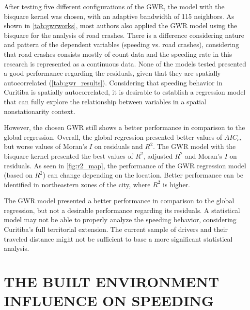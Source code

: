 

After testing five different configurations of the GWR, the model with the bisquare kernel was chosen, with an adaptive bandwidth of 115 neighbors. As shown in \autoref{tab:gwrworks}, most authors also applied the GWR model using the bisquare for the analysis of road crashes. There is a difference considering nature and pattern of the dependent variables (speeding vs. road crashes), considering that road crashes consists mostly of count data and the speeding rate in this research is represented as a continuous data. None of the models tested presented a good performance regarding the residuals, given that they are spatially autocorrelated (\autoref{tab:gwr_results}). Considering that speeding behavior in Curitiba is spatially autocorrelated, it is desirable to establish a regression model that can fully explore the relationship between variables in a spatial nonstationarity context. 

However, the chosen GWR still shows a better performance in comparison to the global regression. Overall, the global regression presented better values of $AIC_c$, but worse values of Moran's $I$ on residuals and $R^2$. The GWR model with the bisquare kernel presented the best values of $R^2$, adjusted $R^2$ and Moran's $I$ on residuals. As seen in \autoref{fig:r2_map}, the performance of the GWR regression model (based on $R^2$) can change depending on the location. Better performance can be identified in northeastern zones of the city, where $R^2$ is higher. 

The GWR model presented a better performance in comparison to the global regression, but not a desirable performance regarding its residuals. A statistical model may not be able to properly analyze the speeding behavior, considering Curitiba's full territorial extension. The current sample of drivers and their traveled distance might not be sufficient to base a more significant statistical analysis.

\section{THE BUILT ENVIRONMENT INFLUENCE ON SPEEDING} \label{sec:be_sp}


